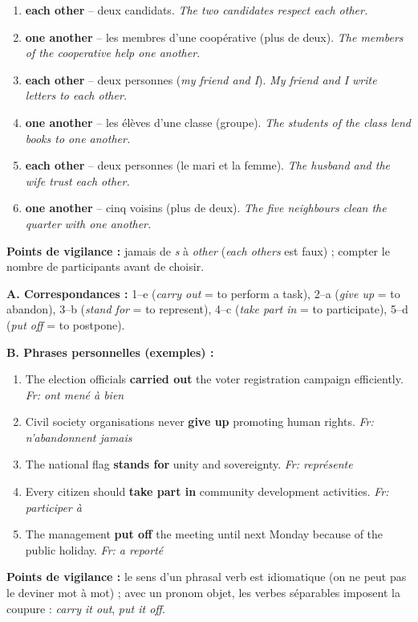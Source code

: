 \documentclass[11pt]{article}
\begin{document}
\begin{corrige}
\begin{enumerate}
\item \textbf{each other} -- deux candidats. \emph{The two candidates respect each other.}
\item \textbf{one another} -- les membres d'une coopérative (plus de deux). \emph{The members of the cooperative help one another.}
\item \textbf{each other} -- deux personnes (\emph{my friend and I}). \emph{My friend and I write letters to each other.}
\item \textbf{one another} -- les élèves d'une classe (groupe). \emph{The students of the class lend books to one another.}
\item \textbf{each other} -- deux personnes (le mari et la femme). \emph{The husband and the wife trust each other.}
\item \textbf{one another} -- cinq voisins (plus de deux). \emph{The five neighbours clean the quarter with one another.}
\end{enumerate}
\textbf{Points de vigilance :} jamais de \emph{s} à \emph{other} (\emph{each others} est faux) ; compter le nombre de participants avant de choisir.
\end{corrige}

\begin{corrige}
\textbf{A. Correspondances :} 1--e (\emph{carry out} = to perform a task), 2--a (\emph{give up} = to abandon), 3--b (\emph{stand for} = to represent), 4--c (\emph{take part in} = to participate), 5--d (\emph{put off} = to postpone).

\textbf{B. Phrases personnelles (exemples) :}
\begin{enumerate}
\item The election officials \textbf{carried out} the voter registration campaign efficiently. \emph{Fr: ont mené à bien}
\item Civil society organisations never \textbf{give up} promoting human rights. \emph{Fr: n'abandonnent jamais}
\item The national flag \textbf{stands for} unity and sovereignty. \emph{Fr: représente}
\item Every citizen should \textbf{take part in} community development activities. \emph{Fr: participer à}
\item The management \textbf{put off} the meeting until next Monday because of the public holiday. \emph{Fr: a reporté}
\end{enumerate}
\textbf{Points de vigilance :} le sens d'un phrasal verb est idiomatique (on ne peut pas le deviner mot à mot) ; avec un pronom objet, les verbes séparables imposent la coupure : \emph{carry it out}, \emph{put it off}.
\end{corrige}
\end{document}
